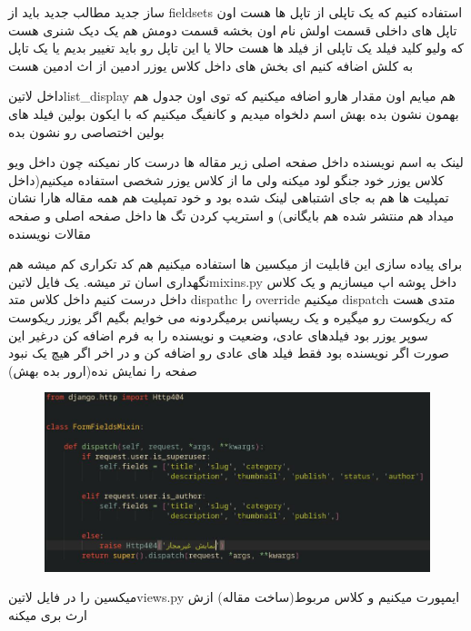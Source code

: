 \documentclass{article}
\begin{document}
	‌ساز
	‌جدید
	‌مطالب
	‌جدید
	باید از fieldsets استفاده کنیم که یک تاپلی از تاپل ها هست اون تاپل های داخلی قسمت اولش نام اون بخشه قسمت دومش هم یک دیک شنری هست
	که ولیو کلید فیلد یک تاپلی از فیلد ها هست حالا یا این تاپل رو باید تغییر بدیم یا یک تاپل به کلش اضافه کنیم ای بخش های داخل کلاس 
	یوزر ادمین از اث ادمین هست
	
	داخل ‌لاتین{list\_display} هم میایم اون مقدار هارو اضافه میکنیم که توی اون جدول هم بهمون نشون بده بهش اسم دلخواه میدیم و کانفیگ 
	میکنیم که با ایکون بولین فیلد های بولین اختصاصی رو نشون بده
	
		لینک به اسم نویسنده داخل صفحه اصلی زیر مقاله ها درست کار نمیکنه چون داخل ویو کلاس یوزر خود جنگو لود میکنه ولی ما از 
		کلاس یوزر شخصی استفاده میکنیم(داخل تمپلیت ها هم به جای اشتباهی لینک شده بود و خود تمپلیت هم همه مقاله هارا نشان میداد هم 
		منتشر شده هم بایگانی) و استریپ کردن تگ ها داخل صفحه اصلی و صفحه مقالات نویسنده

		برای پیاده سازی این قابلیت از میکسین ها استفاده میکنیم هم کد تکراری کم میشه هم نگهداری اسان تر میشه.
		یک فایل ‌لاتین{mixins.py} داخل پوشه اپ میسازیم و یک کلاس داخل درست کنیم داخل کلاس متد dispathc را override
		 میکنیم dispatch متدی هست که ریکوست رو میگیره و یک ریسپانس برمیگردونه می خوایم بگیم اگر یوزر ریکوست سوپر یوزر بود
		 فیلدهای عادی، وضعیت و نویسنده را به فرم اضافه کن درغیر این صورت اگر نویسنده بود فقط فیلد های عادی رو اضافه کن و
		 در اخر اگر هیچ یک نبود صفحه را نمایش نده(ارور بده بهش)
		 \begin{figure}[h!]
		 	\includegraphics[width=\linewidth]{mehran-tarif-course-code-pic/FormFieldMixinPic.jpg}
		 \end{figure}
		 میکسین را در فایل ‌لاتین{views.py} ایمپورت میکنیم و کلاس مربوط(ساخت مقاله) ازش ارث بری میکنه
		 
\end{document}
